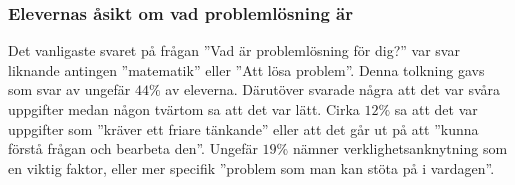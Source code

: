 \subsubsection{Elevernas åsikt om vad problemlösning är}
    \textcolor{lila}{Det vanligaste svaret på frågan ''Vad är problemlösning för dig?'' var svar liknande antingen ''matematik'' eller ''Att lösa problem''. Denna tolkning gavs som svar av ungefär $44\%$ av eleverna. Därutöver svarade några att det var svåra uppgifter medan någon tvärtom sa att det var lätt. Cirka $12\%$ sa att det var uppgifter som ''kräver ett friare tänkande'' eller att det går ut på att ''kunna förstå frågan och bearbeta den''. Ungefär $19\%$ nämner verklighetsanknytning som en viktig faktor, eller mer specifik ''problem som man kan stöta på i vardagen''.}


